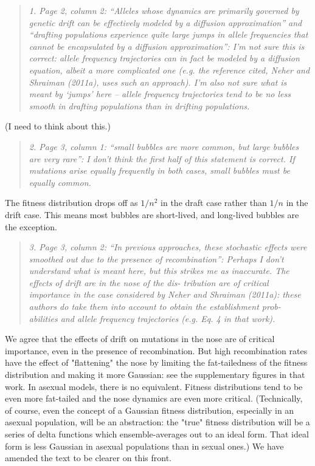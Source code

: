 \documentclass[11pt]{article}
\newenvironment{reviewerquote}{\begin{quote}\color{black}\itshape}{\end{quote}}
\begin{document}
\begin{reviewerquote}
1. Page 2, column 2: “Alleles whose dynamics are primarily governed by genetic drift can be effectively modeled by a diffusion approximation” and “drafting populations experience quite large jumps in allele frequencies that cannot be encapsulated by a diffusion approximation”: I’m not sure this is correct: allele frequency trajectories can in fact be modeled by a diffusion equation, albeit a more complicated one (e.g. the reference cited, Neher and Shraiman (2011a), uses such an approach). I’m also not sure what is meant by ‘jumps’ here – allele frequency trajectories tend to be no less smooth in drafting populations than in drifting populations.
\end{reviewerquote}

(I need to think about this.)

\begin{reviewerquote}
2. Page 3, column 1: “small bubbles are more common, but large bubbles are very rare”: I don’t think the first half of this statement is correct. If mutations arise equally frequently in both cases, small bubbles must be equally common.
\end{reviewerquote}

The fitness distribution drops off as $1/n^2$ in the draft case rather than $1/n$ in the drift case. This means most bubbles are short-lived, and long-lived bubbles are the exception.

\begin{reviewerquote}
3. Page 3, column 2: “In previous approaches, these stochastic effects were smoothed out due to the presence of recombination”: Perhaps I don’t understand what is meant here, but this strikes me as inaccurate. The effects of drift are in the nose of the dis- tribution are of critical importance in the case considered by Neher and Shraiman (2011a): these authors do take them into account to obtain the establishment prob- abilities and allele frequency trajectories (e.g. Eq. 4 in that work).
\end{reviewerquote}

We agree that the effects of drift on mutations in the nose are of critical importance, even in the presence of recombination. But high recombination rates have the effect of "flattening" the nose by limiting the fat-tailedness of the fitness distribution and making it more Gaussian: see the supplementary figures in that work. In asexual models, there is no equivalent. Fitness distributions tend to be even more fat-tailed and the nose dynamics are even more critical. (Technically, of course, even the concept of a Gaussian fitness distribution, especially in an asexual population, will be an abstraction: the "true" fitness distribution will be a series of delta functions which ensemble-averages out to an ideal form. That ideal form is less Gaussian in asexual populations than in sexual ones.) We have amended the text to be clearer on this front.
\end{document}
